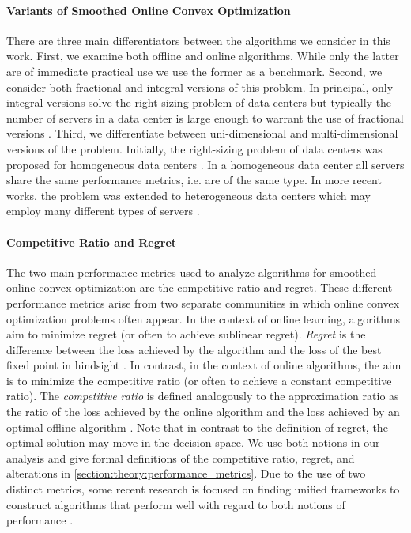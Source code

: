 \paragraph{Variants of Smoothed Online Convex Optimization} There are three main differentiators between the algorithms we consider in this work. First, we examine both offline and online algorithms. While only the latter are of immediate practical use we use the former as a benchmark. Second, we consider both fractional and integral versions of this problem. In principal, only integral versions solve the right-sizing problem of data centers but typically the number of servers in a data center is large enough to warrant the use of fractional versions \cite{Bansal2015}. Third, we differentiate between uni-dimensional and multi-dimensional versions of the problem. Initially, the right-sizing problem of data centers was proposed for homogeneous data centers \cite{Lin2011, Bansal2015, Albers2018}. In a homogeneous data center all servers share the same performance metrics, i.e. are of the same type. In more recent works, the problem was extended to heterogeneous data centers which may employ many different types of servers \cite{Lin2012, Chen2018, Goel2019, Albers2021, Albers2021_2}.

\paragraph{Competitive Ratio and Regret} The two main performance metrics used to analyze algorithms for smoothed online convex optimization are the competitive ratio and regret. These different performance metrics arise from two separate communities in which online convex optimization problems often appear. In the context of online learning, algorithms aim to minimize regret (or often to achieve sublinear regret). \emph{Regret} is the difference between the loss achieved by the algorithm and the loss of the best fixed point in hindsight \cite{Chen2018}. In contrast, in the context of online algorithms, the aim is to minimize the competitive ratio (or often to achieve a constant competitive ratio). The \emph{competitive ratio} is defined analogously to the approximation ratio as the ratio of the loss achieved by the online algorithm and the loss achieved by an optimal offline algorithm \cite{Chen2018}. Note that in contrast to the definition of regret, the optimal solution may move in the decision space. We use both notions in our analysis and give formal definitions of the competitive ratio, regret, and alterations in \autoref{section:theory:performance_metrics}. Due to the use of two distinct metrics, some recent research is focused on finding unified frameworks to construct algorithms that perform well with regard to both notions of performance \cite{Chen2018, Goel2019}.

